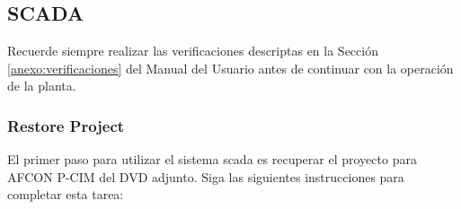 \newpage
\subsection{SCADA}
\label{anexo:operacionSCADA}

\begin{lattention}
 Recuerde siempre realizar las verificaciones descriptas en la Sección 
\ref{anexo:verificaciones} del Manual del Usuario antes de continuar con la
operación de la planta.
\end{lattention}

\subsubsection{Restore Project}
El primer paso para utilizar el sistema \gls{scada} es recuperar el 
proyecto para AFCON P-CIM del DVD adjunto. Siga las siguientes instrucciones 
para completar esta tarea:
